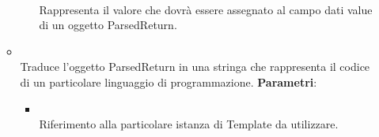 \begin{itemize}
\begin{itemize}
\begin{itemize}
\\ Rappresenta il valore che dovrà essere assegnato al campo dati value di un oggetto ParsedReturn.
\end{itemize}
\item {}
\\ Traduce l'oggetto ParsedReturn in una stringa che rappresenta il codice di un particolare linguaggio di programmazione.
\textbf{Parametri}:
\begin{itemize}
\item {}
\\ Riferimento alla particolare istanza di Template da utilizzare.
\end{itemize}
\end{itemize}
\end{itemize}

